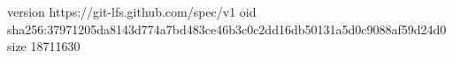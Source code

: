 version https://git-lfs.github.com/spec/v1
oid sha256:37971205da8143d774a7bd483ce46b3c0c2dd16db50131a5d0c9088af59d24d0
size 18711630
